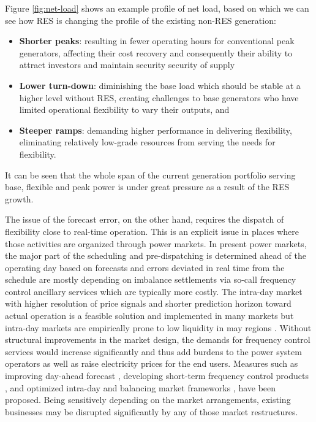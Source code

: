 Figure \ref{fig:net-load} shows an example profile of net load, based on which we can see how RES is changing the profile of the existing non-RES generation:

\begin{itemize}
	\item \textbf{Shorter peaks}: resulting in fewer operating hours for conventional peak generators, affecting their cost recovery and consequently their ability to attract investors and maintain security security of supply
	\item \textbf{Lower turn-down}: diminishing the base load which should be stable at a higher level without RES, creating challenges to base generators who have limited operational flexibility to vary their outputs, and
	\item \textbf{Steeper ramps}: demanding higher performance in delivering flexibility, eliminating relatively low-grade resources from serving the needs for flexibility.
\end{itemize}

It can be seen that the whole span of the current generation portfolio serving base, flexible and peak power is under great pressure as a result of the RES growth.

The issue of the forecast error, on the other hand, requires the dispatch of flexibility close to real-time operation. This is an explicit issue in places where those activities are organized through power markets. In present power markets, the major part of the scheduling and pre-dispatching is determined ahead of the operating day based on forecasts and errors deviated in real time from the schedule are mostly depending on imbalance settlements via so-call frequency control ancillary services which are typically more costly\cite{Ranci2013,Srivastava2011}. The intra-day market with higher resolution of price signals and shorter prediction horizon toward actual operation is a feasible solution and implemented in many markets\cite{Srivastava2011} but intra-day markets are empirically prone to low liquidity in may regions \cite{Lund2015, Hagemann2015,Weber2010}. Without structural improvements in the market design, the demands for frequency control services would increase significantly and thus add burdens to the power system operators \cite{GEEnergyConsulting2014,Krad2017,Koch2009} as well as raise electricity prices for the end users. Measures such as improving day-ahead forecast \cite{Woo2016}, developing short-term frequency control products \cite{Gonzalez-Aparicio2015}, and optimized intra-day \cite{Weber2010} and balancing market frameworks \cite{Wartsila2014}, have been proposed. Being sensitively depending on the market arrangements, existing businesses may be disrupted significantly by any of those market restructures.

